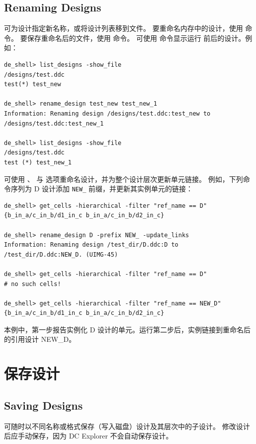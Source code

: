 \subsection*{Renaming Designs}

可为设计指定新名称，或将设计列表移到文件。
要重命名内存中的设计，使用  命令。
要保存重命名后的文件，使用  命令。
可使用  命令显示运行  前后的设计。例如：
\begin{lstlisting}
de_shell> list_designs -show_file
/designs/test.ddc
test(*) test_new

de_shell> rename_design test_new test_new_1
Information: Renaming design /designs/test.ddc:test_new to
/designs/test.ddc:test_new_1

de_shell> list_designs -show_file
/designs/test.ddc
test (*) test_new_1
\end{lstlisting}

可使用 、 与  选项重命名设计，并为整个设计层次更新单元链接。
例如，下列命令序列为 D 设计添加 \texttt{NEW\_} 前缀，并更新其实例单元的链接：
\begin{lstlisting}
de_shell> get_cells -hierarchical -filter "ref_name == D"
{b_in_a/c_in_b/d1_in_c b_in_a/c_in_b/d2_in_c}

de_shell> rename_design D -prefix NEW_ -update_links
Information: Renaming design /test_dir/D.ddc:D to
/test_dir/D.ddc:NEW_D. (UIMG-45)

de_shell> get_cells -hierarchical -filter "ref_name == D"
# no such cells!

de_shell> get_cells -hierarchical -filter "ref_name == NEW_D"
{b_in_a/c_in_b/d1_in_c b_in_a/c_in_b/d2_in_c}
\end{lstlisting}

本例中，第一步报告实例化 D 设计的单元。运行第二步后，实例链接到重命名后的引用设计 NEW\_D。

\section{保存设计}
\subsection*{Saving Designs}

可随时以不同名称或格式保存（写入磁盘）设计及其层次中的子设计。
修改设计后应手动保存，因为 DC Explorer 不会自动保存设计。

